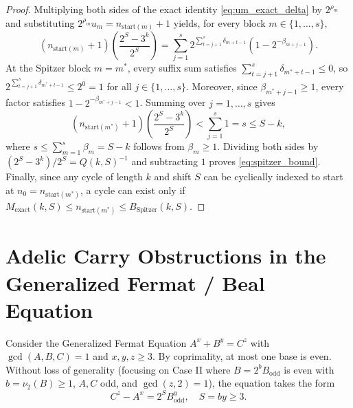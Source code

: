 \documentclass[11pt, a4paper]{amsart}
\theoremstyle{definition}
\begin{document}
\begin{proof}
Multiplying both sides of the exact identity \eqref{eq:um_exact_delta} by $2^{\rho_m}$ and substituting $2^{\rho_m} u_m = n_{\text{start}(m)} + 1$ yields, for every block $m \in \{1, \dots, s\}$,
\begin{equation}\label{eq:n_start_delta}
\left(n_{\text{start}(m)} + 1\right) \left(\frac{2^S - 3^k}{2^S}\right) = \sum_{j=1}^s 2^{\sum_{t=j+1}^s \delta_{m+t-1}} \left(1 - 2^{-\beta_{m+j-1}}\right).
\end{equation}
At the Spitzer block $m = m^*$, every suffix sum satisfies $\sum_{t=j+1}^s \delta_{m^*+t-1} \le 0$, so $2^{\sum_{t=j+1}^s \delta_{m^*+t-1}} \le 2^0 = 1$ for all $j \in \{1, \dots, s\}$. Moreover, since $\beta_{m^*+j-1} \ge 1$, every factor satisfies $1 - 2^{-\beta_{m^*+j-1}} < 1$. Summing over $j = 1, \dots, s$ gives
\[
\left(n_{\text{start}(m^*)} + 1\right) \left(\frac{2^S - 3^k}{2^S}\right) < \sum_{j=1}^s 1 = s \le S - k,
\]
where $s \le \sum_{m=1}^s \beta_m = S - k$ follows from $\beta_m \ge 1$. Dividing both sides by $(2^S - 3^k)/2^S = Q(k, S)^{-1}$ and subtracting $1$ proves \eqref{eq:spitzer_bound}. Finally, since any cycle of length $k$ and shift $S$ can be cyclically indexed to start at $n_0 = n_{\text{start}(m^*)}$, a cycle can exist only if $M_{\text{exact}}(k, S) \le n_{\text{start}(m^*)} \le B_{\text{Spitzer}}(k, S)$.
\end{proof}

\section{Adelic Carry Obstructions in the Generalized Fermat / Beal Equation}

Consider the Generalized Fermat Equation $A^x + B^y = C^z$ with $\gcd(A,B,C) = 1$ and $x, y, z \ge 3$. By coprimality, at most one base is even. Without loss of generality (focusing on Case II where $B = 2^b B_{\text{odd}}$ is even with $b = \nu_2(B) \ge 1$, $A, C$ odd, and $\gcd(z, 2) = 1$), the equation takes the form
\begin{equation}\label{eq:beal_2adic}
C^z - A^x = 2^S B_{\text{odd}}^y, \quad S = b y \ge 3.
\end{equation}
\end{document}
